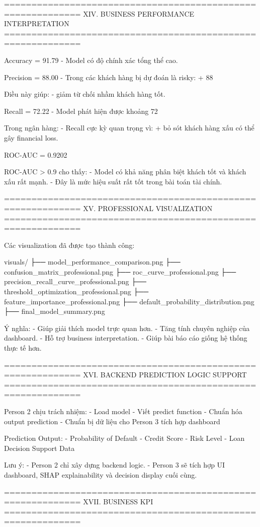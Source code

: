 ============================================================
XIV. BUSINESS PERFORMANCE INTERPRETATION
============================================================

Accuracy = 91.79%
- Model có độ chính xác tổng thể cao.

Precision = 88.00%
- Trong các khách hàng bị dự đoán là risky:
  + 88%

Điều này giúp:
- giảm từ chối nhầm khách hàng tốt.

Recall = 72.22%
- Model phát hiện được khoảng 72%

Trong ngân hàng:
- Recall cực kỳ quan trọng vì:
  + bỏ sót khách hàng xấu có thể gây financial loss.

ROC-AUC = 0.9202

ROC-AUC > 0.9 cho thấy:
- Model có khả năng phân biệt khách tốt và khách xấu rất mạnh.
- Đây là mức hiệu suất rất tốt trong bài toán tài chính.

============================================================
XV. PROFESSIONAL VISUALIZATION
============================================================

Các visualization đã được tạo thành công:

visuals/
├── model_performance_comparison.png
├── confusion_matrix_professional.png
├── roc_curve_professional.png
├── precision_recall_curve_professional.png
├── threshold_optimization_professional.png
├── feature_importance_professional.png
├── default_probability_distribution.png
├── final_model_summary.png

Ý nghĩa:
- Giúp giải thích model trực quan hơn.
- Tăng tính chuyên nghiệp của dashboard.
- Hỗ trợ business interpretation.
- Giúp bài báo cáo giống hệ thống thực tế hơn.

============================================================
XVI. BACKEND PREDICTION LOGIC SUPPORT
============================================================

Person 2 chịu trách nhiệm:
- Load model
- Viết predict function
- Chuẩn hóa output prediction
- Chuẩn bị dữ liệu cho Person 3 tích hợp dashboard

Prediction Output:
- Probability of Default
- Credit Score
- Risk Level
- Loan Decision Support Data

Lưu ý:
- Person 2 chỉ xây dựng backend logic.
- Person 3 sẽ tích hợp UI dashboard, SHAP explainability và decision display cuối cùng.

============================================================
XVII. BUSINESS KPI
============================================================


